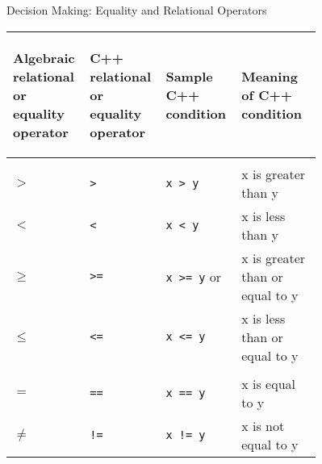 \documentclass[11pt]{beamer}
\begin{document}
\begin{frame}{\small Decision Making: Equality and Relational Operators}
	\centering\tiny\renewcommand{\arraystretch}{2}
	\begin{tabular}{p{0.16\linewidth} p{0.15\linewidth} p{0.2\linewidth} p{0.25\linewidth}}
		
	\rowcolor{cyan}\color{white} 
	\begin{flushleft}
		Algebraic relational or equality operator
	\end{flushleft} & 
	\color{white}
	 \begin{flushleft}
		C++ relational or equality operator
	\end{flushleft} & 
	\color{white}
	\begin{flushleft}
		 Sample C++ condition
	\end{flushleft} & 
	\color{white} 
	\begin{flushleft}
		Meaning of C++ condition
	\end{flushleft} \\\hline
		
		\rowcolor{lightcyan} \multicolumn{4}{l}{Relational operators} \\
		
		\rowcolor{lightcyan} $>$ & \texttt{>} & \texttt{x > y} & x is greater than y \\
		
		\rowcolor{lightcyan} $<$ & \texttt{<} & \texttt{x < y} & x is less than y \\
		
		\rowcolor{lightcyan} $\geq$ & \texttt{>=} & \texttt{x >= y} or & x is greater than or equal to y \\
		
		\rowcolor{lightcyan} $\leq$ & \texttt{<=} & \texttt{x <= y} & x is less than or equal to y \\\hline
		
		\rowcolor{lightcyan} \multicolumn{4}{l}{Equality operators} \\
		
		\rowcolor{lightcyan} $=$ & \texttt{==} & \texttt{x == y} & x is equal to y \\
		
		\rowcolor{lightcyan} $\neq$ & \texttt{!=} & \texttt{x != y} & x is not equal to y \\\hline
	\end{tabular}
\end{frame}


%
\end{document}
